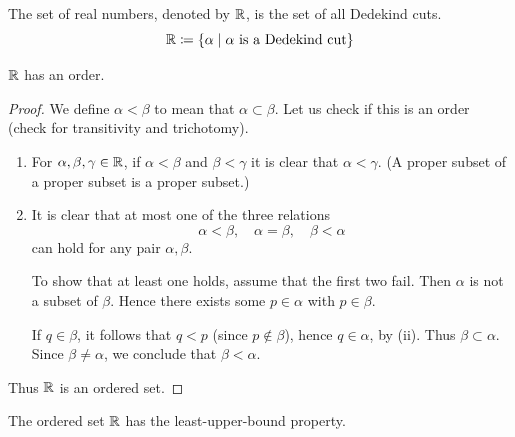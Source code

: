 \begin{definition}
The set of real numbers, denoted by $\mathbb R$, is the set of all Dedekind cuts.
\[ \mathbb R\coloneqq\{\alpha\mid\alpha\text{ is a Dedekind cut}\} \]
\end{definition}

\begin{proposition}
$\mathbb R$ has an order.
\end{proposition}

\begin{proof}
We define $\alpha<\beta$ to mean that $\alpha\subset\beta$. Let us check if this is an order (check for transitivity and trichotomy).
\begin{enumerate}[label=(\arabic*)]
\item For $\alpha,\beta,\gamma\in\mathbb R$, if $\alpha<\beta$ and $\beta<\gamma$ it is clear that $\alpha<\gamma$. (A proper subset of a proper subset is a proper subset.)

\item It is clear that at most one of the three relations
\[ \alpha<\beta, \quad \alpha=\beta, \quad \beta<\alpha \]
can hold for any pair $\alpha,\beta$. 

To show that at least one holds, assume that the first two fail. Then $\alpha$ is not a subset of $\beta$. Hence there exists some $p\in\alpha$ with $p\in\beta$.

If $q\in\beta$, it follows that $q<p$ (since $p\notin\beta$), hence $q\in\alpha$, by (ii). Thus $\beta\subset\alpha$. Since $\beta\neq\alpha$, we conclude that $\beta<\alpha$.
\end{enumerate}
Thus $\mathbb R$ is an ordered set.
\end{proof}

\begin{proposition}
The ordered set $\mathbb R$ has the least-upper-bound property.
\end{proposition}

